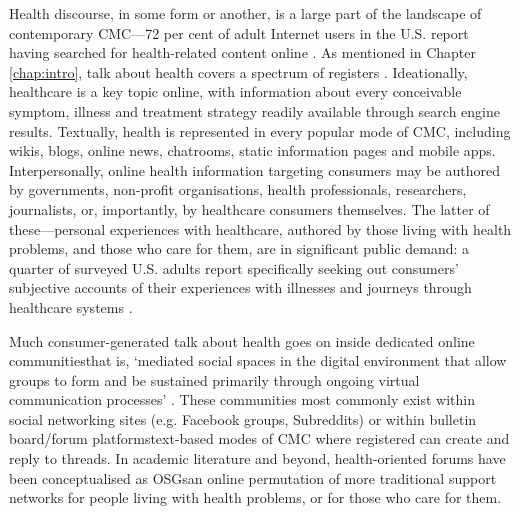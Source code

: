 Health discourse, in some form or another, is a large part of the landscape of contemporary \gls{CMC}---72 per cent of adult Internet users in the U.S. report having searched for health\hyp{}related content online \cite{fox_health_2013,fox_social_2014}. As mentioned in Chapter \ref{chap:intro}, talk about health covers a spectrum of registers \cite[in the systemic-functional sense\textemdash{}see][as well as Section \ref{sect:sfl}]{halliday_introduction_2004}. Ideationally, healthcare is a key topic online, with information about every conceivable symptom, illness and treatment strategy readily available through search engine results. Textually, health is represented in every popular \gls{mode} of \gls{CMC}, including wikis, blogs, online news, chatrooms, static information pages and mobile apps. Interpersonally, online health information targeting \glspl{consumer}%
may be authored by governments, non\hyp{}profit organisations, health professionals, researchers, journalists, or, importantly, by healthcare consumers themselves. The latter of these---personal experiences with healthcare, authored by those living with health problems, and those who care for them, are in significant public demand: a quarter of surveyed U.S. adults report specifically seeking out \glspl{consumer}' subjective accounts of their experiences with illnesses and journeys through healthcare systems \cite{fox_social_2014}.

Much consumer\hyp{}generated talk about health goes on inside dedicated online communities\textemdash{}that is, `mediated social spaces in the digital environment that allow groups to form and be sustained primarily through ongoing virtual communication processes' \cite[p.~986]{shen_effects_2013}. These communities most commonly exist within social networking sites (e.g. Facebook groups, Subreddits) or within bulletin board\slash \gls{forum} platforms\textemdash{}text-based \glspl{mode} of \gls{CMC} where registered  can create and reply to \glspl{thread}. In academic literature and beyond, health\hyp{}oriented \glspl{forum} have been conceptualised as \glspl{OSG}\textemdash{}an online permutation of more traditional support networks for people living with health problems, or for those who care for them.

